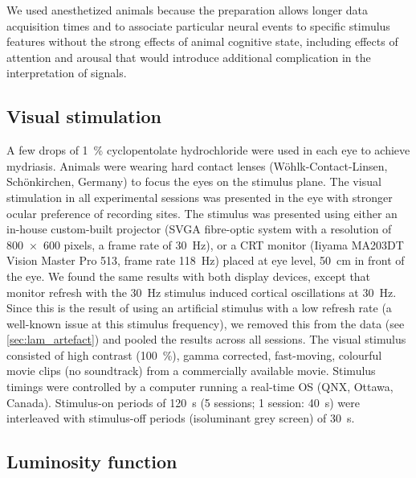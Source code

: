 We used anesthetized animals because the preparation allows longer data acquisition times and to associate particular neural events to specific stimulus features without the strong effects of animal cognitive state, including effects of attention and arousal that would introduce additional complication in the interpretation of signals.


\subsection{Visual stimulation}

A few drops of \SI{1}{\percent} cyclopentolate hydrochloride were used in each eye to achieve mydriasis.
Animals were wearing hard contact lenses (W\"ohlk-Contact-Linsen, Sch\"onkirchen, Germany) to focus the eyes on the stimulus plane.
The visual stimulation in all experimental sessions was presented in the eye with stronger ocular preference of recording sites.
The stimulus was presented using either an in-house custom-built projector (SVGA fibre-optic system with a resolution of \num{800x600} pixels, a frame rate of \SI{30}{Hz}), or a \ac{CRT} monitor (Iiyama MA203DT Vision Master Pro 513, frame rate \SI{118}{Hz}) placed at eye level, \SI{50}{\centi\metre} in front of the eye.
We found the same results with both display devices, except that monitor refresh with the \SI{30}{Hz} stimulus induced cortical oscillations at \SI{30}{Hz}.
Since this is the result of using an artificial stimulus with a low refresh rate (a well-known issue at this stimulus frequency), we removed this from the data (see \autoref{sec:lam_artefact}) and pooled the results across all sessions.
The visual stimulus consisted of high contrast (\SI{100}{\percent}), gamma corrected, fast-moving, colourful movie clips (no soundtrack) from a commercially available movie.
Stimulus timings were controlled by a computer running a real-time OS (QNX, Ottawa, Canada).
Stimulus-on periods of \SI{120}{\second} (\num{5} sessions; \num{1} session: \SI{40}{\second}) were interleaved with stimulus-off periods (isoluminant grey screen) of \SI{30}{\second}.


\subsection{Luminosity function}
\label{sec:lam_lumos}

